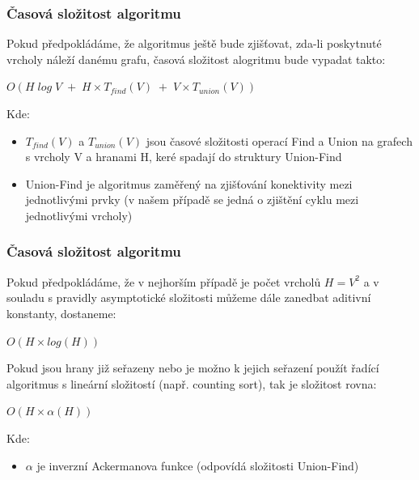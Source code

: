 \documentclass[hidelinks, 10pt, pdf, hyperref={unicode}]{beamer}
\begin{document}
    \begin{frame}
        \frametitle{Časová složitost algoritmu}
        Pokud předpokládáme, že algoritmus ještě bude zjišťovat, zda-li poskytnuté vrcholy náleží danému grafu, časová složitost alogritmu bude vypadat takto: \
        \begin{center}
            $O(H\;log\;V\;+\;H \times T_{find}(V)\;+\;V \times T_{union}(V))$
        \end{center}
        Kde:
            \begin{itemize}
                \item{$T_{find}(V)$ a $T_{union}(V)$ jsou časové složitosti operací Find a Union na grafech s vrcholy V a hranami H, keré spadají do struktury Union-Find}
                \item{Union-Find je algoritmus zaměřený na zjišťování konektivity mezi jednotlivými prvky (v našem případě se jedná o zjištění cyklu mezi jednotlivými vrcholy)} 
            \end{itemize}
    \end{frame}

    \begin{frame}
        \frametitle{Časová složitost algoritmu}
        Pokud předpokládáme, že v nejhorším případě je počet vrcholů $H=V^2$ a v souladu s pravidly asymptotické složitosti můžeme dále zanedbat aditivní konstanty, dostaneme:
        \begin{center}
            $O(H \times log(H))$
        \end{center}
        Pokud jsou hrany již seřazeny nebo je možno k jejich seřazení použít řadící algoritmus s lineární složitostí (např. counting sort), tak je složitost rovna: \\
        \begin{center}
            $O(H \times \alpha (H))$
        \end{center}
        Kde:
        \begin{itemize}
            \item{$\alpha$ je inverzní Ackermanova funkce (odpovídá složitosti Union-Find)}
        \end{itemize}
    \end{frame}
\end{document}

